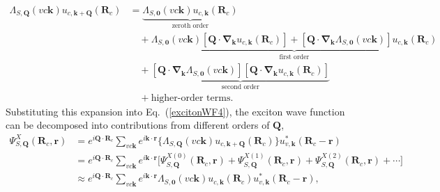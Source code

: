 \begin{equation}
\begin{aligned}
\Lambda_{S,\boldsymbol{Q}}(vc\boldsymbol{k})
u_{c,\boldsymbol{k}+\boldsymbol{Q}}(\boldsymbol{R}_c)
&=
\underbrace{
\Lambda_{S,\boldsymbol{0}}(vc\boldsymbol{k})
u_{c,\boldsymbol{k}}(\boldsymbol{R}_c)
}_{\text{zeroth order}}
\\
&\quad+
\underbrace{
\Lambda_{S,\boldsymbol{0}}(vc\boldsymbol{k})
\left[
\boldsymbol{Q}\cdot
\boldsymbol{\nabla}_{\boldsymbol{k}}
u_{c,\boldsymbol{k}}(\boldsymbol{R}_c)
\right]
+
\left[
\boldsymbol{Q}\cdot
\boldsymbol{\nabla}_{\boldsymbol{k}}
\Lambda_{S,\boldsymbol{0}}(vc\boldsymbol{k})
\right]
u_{c,\boldsymbol{k}}(\boldsymbol{R}_c)
}_{\text{first order}}
\\
&\quad+
\underbrace{
\left[
\boldsymbol{Q}\cdot
\boldsymbol{\nabla}_{\boldsymbol{k}}
\Lambda_{S,\boldsymbol{0}}(vc\boldsymbol{k})
\right]
\left[
\boldsymbol{Q}\cdot
\boldsymbol{\nabla}_{\boldsymbol{k}}
u_{c,\boldsymbol{k}}(\boldsymbol{R}_c)
\right]
}_{\text{second order}}
\\
&\quad+
\text{higher-order terms}.
\end{aligned}
\end{equation}
Substituting this expansion into Eq.~(\ref{excitonWF4}), the exciton wave function can be decomposed into contributions from different orders of $\boldsymbol{Q}$,
\begin{equation}
\begin{aligned}
\Psi^{X}_{S,\boldsymbol{Q}}
(\boldsymbol{R}_c,\boldsymbol{r})
&=
e^{i\boldsymbol{Q}\cdot\boldsymbol{R}_c}
\sum_{vc\boldsymbol{k}}
e^{i\boldsymbol{k}\cdot\boldsymbol{r}}
\Big\{
\Lambda_{S,\boldsymbol{Q}}(vc\boldsymbol{k})
u_{c,\boldsymbol{k}+\boldsymbol{Q}}(\boldsymbol{R}_c)
\Big\}
u^{*}_{v,\boldsymbol{k}}
(\boldsymbol{R}_c-\boldsymbol{r})
\\
&=
e^{i\boldsymbol{Q}\cdot\boldsymbol{R}_c}
\sum_{vc\boldsymbol{k}}
e^{i\boldsymbol{k}\cdot\boldsymbol{r}}
\Big[
\Psi^{X(0)}_{S,\boldsymbol{Q}}
(\boldsymbol{R}_c,\boldsymbol{r})
+
\Psi^{X(1)}_{S,\boldsymbol{Q}}
(\boldsymbol{R}_c,\boldsymbol{r})
+
\Psi^{X(2)}_{S,\boldsymbol{Q}}
(\boldsymbol{R}_c,\boldsymbol{r})
+\cdots
\Big]
\\
&\approx
e^{i\boldsymbol{Q}\cdot\boldsymbol{R}_c}
\sum_{vc\boldsymbol{k}}
e^{i\boldsymbol{k}\cdot\boldsymbol{r}}
\Lambda_{S,\boldsymbol{0}}(vc\boldsymbol{k})
u_{c,\boldsymbol{k}}(\boldsymbol{R}_c)
u^{*}_{v,\boldsymbol{k}}
(\boldsymbol{R}_c-\boldsymbol{r}),
\end{aligned}
\label{excitonWF_expanded}
\end{equation}
